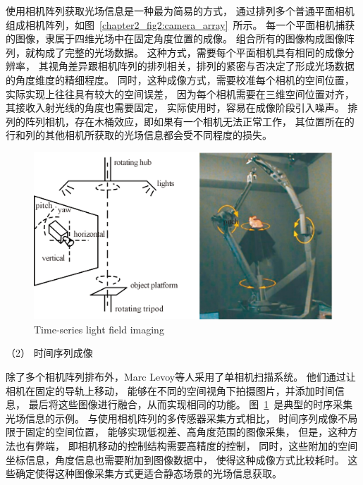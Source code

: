 使用相机阵列获取光场信息是一种最为简易的方式，
通过排列多个普通平面相机组成相机阵列，如图~\ref{chapter2_fig2:camera_array}~所示。
每一个平面相机捕获的图像，隶属于四维光场中在固定角度位置的成像。
组合所有的图像构成图像阵列，就构成了完整的光场数据。
这种方式，需要每个平面相机具有相同的成像分辨率，
其视角差异跟相机阵列的排列相关，排列的紧密与否决定了形成光场数据的角度维度的精细程度。
同时，这种成像方式，需要校准每个相机的空间位置，实际实现上往往具有较大的空间误差，
因为每个相机需要在三维空间位置对齐，其接收入射光线的角度也需要固定，
实际使用时，容易在成像阶段引入噪声。
排列的阵列相机，存在木桶效应，即如果有一个相机无法正常工作，
其位置所在的行和列的其他相机所获取的光场信息都会受不同程度的损失。












\begin{figure}[t]
	\centering
	\includegraphics[width=0.75\linewidth]{figures/chapter2/time_seq2}
	{Time-series light field imaging}  
	\label{chapter2_fig3:time_seq2}
\end{figure}



（2）
时间序列成像


除了多个相机阵列排布外，Marc Levoy等人采用了单相机扫描系统。
他们通过让相机在固定的导轨上移动，
能够在不同的空间视角下拍摄图片，并添加时间信息，
最后将这些图像进行融合，从而实现相同的功能。
图~\ref{chapter2_fig3:time_seq2}~是典型的时序采集光场信息的示例。
与使用相机阵列的多传感器采集方式相比，
时间序列成像不局限于固定的空间位置，
能够实现低视差、高角度范围的图像采集，
但是，这种方法也有弊端，
即相机移动的控制结构需要高精度的控制，
同时，这些附加的空间坐标信息，角度信息也需要附加到图像数据中，
使得这种成像方式比较耗时。
这些确定使得这种图像采集方式更适合静态场景的光场信息获取。






